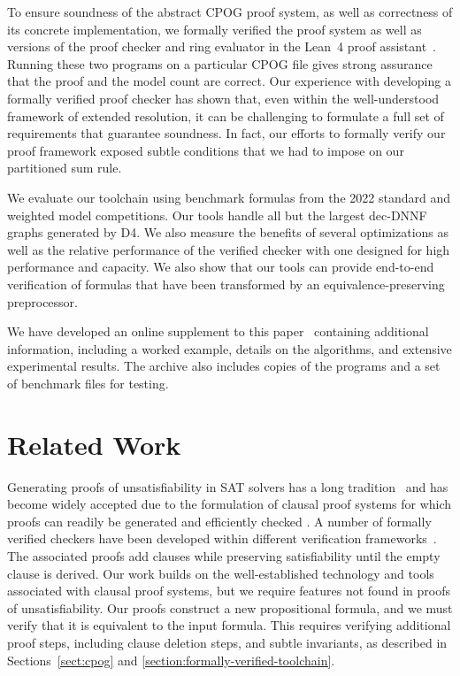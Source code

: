 \documentclass[letterpaper,USenglish,cleveref, autoref, thm-restate]{lipics-v2021}
\newcommand{\progname}[1]{\textsc{#1}}
\newcommand{\dfour}{\progname{D4}}
\newcommand{\lean}{Lean~4}
\begin{document}
To ensure soundness of the abstract CPOG proof system, as well as
correctness of its concrete implementation, we formally verified the
proof system as well as versions of the proof checker and ring
evaluator in the \lean{} proof assistant~\cite{demoura:cade:2021}.
Running these two programs on a particular CPOG file gives strong
assurance that the proof and the model count are correct. Our
experience with developing a formally verified proof checker has shown
that, even within the well-understood framework of extended
resolution, it can be challenging to formulate a full set of
requirements that guarantee soundness.  In fact, our efforts to
formally verify our proof framework exposed subtle conditions that we had
to impose on our partitioned sum rule.

We evaluate our toolchain using benchmark formulas from the 2022
standard and weighted model competitions.  Our tools handle all but
the largest dec-DNNF graphs generated by \dfour{}.  We also measure
the benefits of several optimizations as well as the relative
performance of the verified checker with one designed for high
performance and capacity.  We also show that our tools can provide
end-to-end verification of formulas that have been transformed by an
equivalence-preserving preprocessor.

We have developed an online supplement to this
paper~\cite{bryant:sat:2023:supplement} containing additional
information, including a worked example, details on the algorithms,
and extensive experimental results.  The archive also includes copies
of the programs and a set of benchmark files for testing.


\section{Related Work}


Generating proofs of unsatisfiability in SAT solvers has a long
tradition~\cite{ZhangMalik} and has become widely accepted due to the
formulation of clausal proof systems for which proofs can readily be
generated and efficiently checked
\cite{RAT,wetzler14_drattrim}.
A number of formally verified checkers have been developed within different verification frameworks~\cite{cruz-cade-2017,lrat,Lammich:20,Tan:2021}.
The associated proofs add clauses while preserving satisfiability until the empty clause is derived.
Our work builds on the well-established technology and tools associated with clausal proof systems,
but we require features not found in proofs of unsatisfiability.
Our proofs construct a new propositional formula, and we must verify
that it
is equivalent to the input formula.  This requires verifying
additional proof steps, including clause deletion steps, and subtle
invariants, as described in Sections~\ref{sect:cpog} and
\ref{section:formally-verified-toolchain}.
\end{document}
